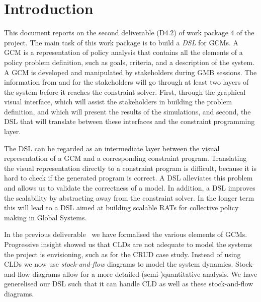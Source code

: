\section{Introduction}\label{introduction}

This document reports on the second deliverable (D4.2) of work package 4 of the
\grace project. The main task of this work package is to build a \emph{\ac{DSL}}
for \acp{GCM}. A \ac{GCM} is a representation of policy analysis that contains
all the elements of a policy problem definition, such as goals, criteria, and
a description of the system. A \ac{GCM} is developed and manipulated by
stakeholders during \ac{GMB} sessions. The information from and for the
stakeholders will go through at least two layers of the \grace system before
it reaches the constraint solver. First, through the graphical visual
interface, which will assist the stakeholders in building the problem
definition, and which will present the results of the simulations, and second,
the \ac{DSL} that will translate between these interfaces and the constraint
programming layer. 
  

The \ac{DSL} can be regarded as an intermediate layer between the visual
representation of a \acf{GCM} and a corresponding constraint program.
Translating the visual representation directly to a constraint program is
difficult, because it is hard to check if the generated program is correct. A
DSL alleviates this problem and allows us to validate the correctness of a
model. In addition, a \ac{DSL} improves the scalability by abstracting away from
the constraint solver. In the longer term this will lead to a \ac{DSL} aimed at
building scalable \acp{RAT} for collective policy making in Global Systems.


In the previous deliverable~\cite{D4.1} we have formalised the various elements
of \acp{GCM}. Progressive insight showed us that \acp{CLD} are not adequate to
model the systems the project is envisioning, such as for the \ac{CRUD} case
study. Instead of using \aclp{CLD} we now use \emph{stock-and-flow} diagrams to
model the system dynamics. Stock-and-flow diagrams allow for a more detailed
(semi-)quantitative analysis. We have generelised our DSL such that it can handle
\acl{CLD} as well as these stock-and-flow diagrams.

